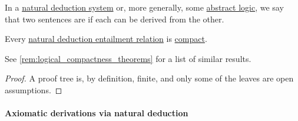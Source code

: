 \begin{definition}\label{def:interderivability}\mimprovised
  In a \hyperref[def:abstract_natural_deduction_system]{natural deduction system} or, more generally, some \hyperref[def:abstract_logic]{abstract logic}, we say that two sentences are  if each can be derived from the other.
\end{definition}

\begin{proposition}\label{thm:propositional_natural_deduction_entailment_compact}
  Every \hyperref[def:natural_deduction_entailment]{natural deduction entailment relation} is \hyperref[def:consequence_relation/compactness]{compact}.
\end{proposition}
\begin{comments}
  \item See \cref{rem:logical_compactness_theorems} for a list of similar results.
\end{comments}
\begin{proof}
  A proof tree is, by definition, finite, and only some of the leaves are open assumptions.
\end{proof}

\paragraph{Axiomatic derivations via natural deduction}

